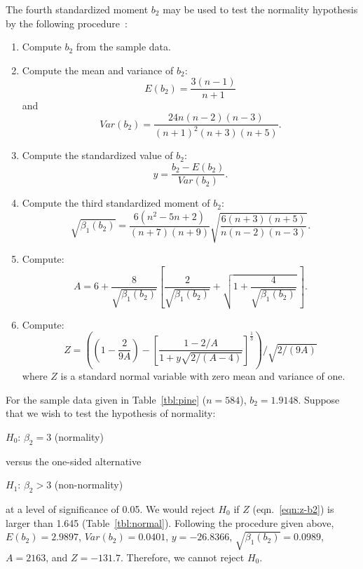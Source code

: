 \documentclass[draft]{article}
\newenvironment{example}{%
   \vspace{\baselineskip}
   \par\noindent\hrulefill\par
   \noindent{\em Example:}}{%
   \par\noindent\hrulefill\par
   \vspace{\baselineskip}}
\begin{document}
The fourth standardized moment \(b_2\) may be used to
test the normality hypothesis by the following
procedure~\cite{anscombe63}:
\begin{enumerate}
\item Compute \(b_2\) from the sample data.
\item Compute the mean and variance of \(b_2\):
\begin{equation}
E\left(b_2\right) = \frac{3\left(n-1\right)}{n+1}
\end{equation}
and
\begin{equation}
Var\left(b_2\right) = \frac{24n\left(n-2\right)\left(n-3\right)}
{\left(n+1\right)^2\left(n+3\right)\left(n+5\right)}.
\end{equation}
\item Compute the standardized value of \(b_2\):
\begin{equation}
y = \frac{b_2-E\left(b_2\right)}{Var\left(b_2\right)}.
\end{equation}
\item Compute the third standardized moment of \(b_2\):
\begin{equation}
\sqrt{\beta_1\left(b_2\right)} =
\frac{6\left(n^2-5n+2\right)}{\left(n+7\right)\left(n+9\right)}
\sqrt{\frac{6\left(n+3\right)\left(n+5\right)}
           {n\left(n-2\right)\left(n-3\right)}}.
\end{equation}
\item Compute:
\begin{equation}
A=6+\frac{8}{\sqrt{\beta_1\left(b_2\right)}}\left[
\frac{2}{\sqrt{\beta_1\left(b_2\right)}} +
\sqrt{1+\frac{4}{\sqrt{\beta_1\left(b_2\right)}}}\,\right].
\end{equation}
\item Compute:
\begin{equation}
\label{eqn:z-b2}
Z = \left(\left(1-\frac{2}{9A}\right)-
\left[\frac{1-2/A}{1+y\sqrt{2/\left(A-4\right)}}\right]^{\frac{1}{3}}\right)/
\sqrt{2/\left(9A\right)}
\end{equation}
where \(Z\) is a standard normal variable with
zero mean and variance of one.
\end{enumerate}

\begin{example}
For the sample data given in Table~\ref{tbl:pine} (\(n=584\)),
\(b_2 =1.9148\).  Suppose that we wish to test the
hypothesis of normality:

\(H_0\): \(\beta_2=3\) (normality)

\noindent versus the one-sided alternative

\(H_1\): \(\beta_2>3\) (non-normality)

\noindent at a level of significance of 0.05. We would
reject \(H_0\) if \(Z\) (eqn.~\ref{eqn:z-b2}) is larger
than 1.645 (Table~\ref{tbl:normal}).  Following the procedure given above,
\(E\left(b_2\right)=2.9897\),
\(Var\left(b_2\right)=0.0401\),
\(y=-26.8366\),
\(\sqrt{\beta_1\left(b_2\right)}=0.0989\),
\(A=2163\), and
\(Z=-131.7\).
Therefore, we cannot reject \(H_0\).
\end{example}
\end{document}
